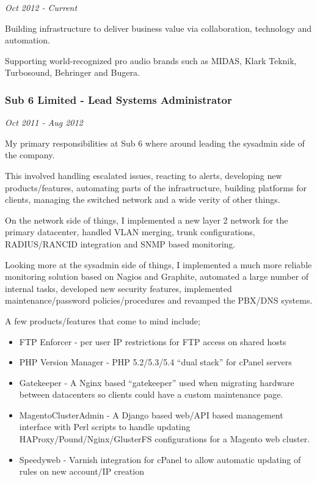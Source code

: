 \emph{Oct 2012 - Current}

Building infrastructure to deliver business value via collaboration,
technology and automation.

Supporting world-recognized pro audio brands such as MIDAS, Klark
Teknik, Turbosound, Behringer and Bugera.

\subsubsection{Sub 6 Limited - Lead Systems Administrator}

\emph{Oct 2011 - Aug 2012}

My primary responsibilities at Sub 6 where around leading the sysadmin
side of the company.

This involved handling escalated issues, reacting to alerts, developing
new products/features, automating parts of the infrastructure, building
platforms for clients, managing the switched network and a wide verity
of other things.

On the network side of things, I implemented a new layer 2 network for
the primary datacenter, handled VLAN merging, trunk configurations,
RADIUS/RANCID integration and SNMP based monitoring.

Looking more at the sysadmin side of things, I implemented a much more
reliable monitoring solution based on Nagios and Graphite, automated a
large number of internal tasks, developed new security features,
implemented maintenance/password policies/procedures and revamped the
PBX/DNS systems.

A few products/features that come to mind include;

\begin{itemize}
\item
  FTP Enforcer - per user IP restrictions for FTP access on shared hosts
\item
  PHP Version Manager - PHP 5.2/5.3/5.4 ``dual stack'' for cPanel
  servers
\item
  Gatekeeper - A Nginx based ``gatekeeper'' used when migrating hardware
  between datacenters so clients could have a custom maintenance page.
\item
  MagentoClusterAdmin - A Django based web/API based management
  interface with Perl scripts to handle updating
  HAProxy/Pound/Nginx/GlusterFS configurations for a Magento web
  cluster.
\item
  Speedyweb - Varnish integration for cPanel to allow automatic updating
  of rules on new account/IP creation
\end{itemize}
